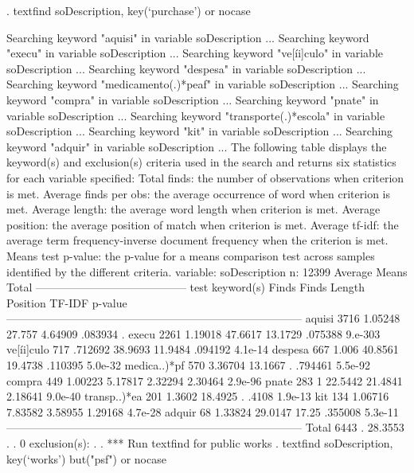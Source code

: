 {\smallskip}
. textfind soDescription, key(`purchase') or nocase
 
Searching keyword "aquisi" in variable soDescription ...
Searching keyword "execu" in variable soDescription ...
Searching keyword "ve[íi]culo" in variable soDescription ...
Searching keyword "despesa" in variable soDescription ...
Searching keyword "medicamento(.)*peaf" in variable soDescription ...
Searching keyword "compra" in variable soDescription ...
Searching keyword "pnate" in variable soDescription ...
Searching keyword "transporte(.)*escola" in variable soDescription ...
Searching keyword "kit" in variable soDescription ...
Searching keyword "adquir" in variable soDescription ...
{\smallskip}
{\smallskip}
The following table displays the keyword(s) and exclusion(s) criteria used in
the search and returns six statistics for each variable specified:
{\smallskip}
Total finds:           the number of observations when criterion is met.
Average finds per obs: the average occurrence of word when criterion is met.
Average length:        the average word length when criterion is met.
Average position:      the average position of match when criterion is met.
Average tf-idf:        the average term frequency-inverse document frequency
                       when the criterion is met.
Means test p-value:    the p-value for a means comparison test across samples
                       identified by the different criteria.
{\smallskip}
                               {}                               
variable:   soDescription
n: 12399                                     Average                       Means
                    Total   -----------------------------------------       test
keyword(s)          Finds      Finds     Length   Position     TF-IDF    p-value
--------------------------------------------------------------------------------
aquisi               3716    1.05248     27.757    4.64909    .083934          .
execu                2261    1.19018    47.6617    13.1729    .075388    9.e-303
ve[íi]culo            717    .712692    38.9693    11.9484    .094192    4.1e-14
despesa               667      1.006    40.8561    19.4738    .110395    5.0e-32
medica..)*p{\tytilde}f         570    3.36704    13.1667          .    .794461    5.5e-92
compra                449    1.00223    5.17817    2.32294    2.30464    2.9e-96
pnate                 283          1    22.5442    21.4841    2.18641    9.0e-40
transp..)*e{\tytilde}a         201     1.3602    18.4925          .      .4108    1.9e-13
kit                   134    1.06716    7.83582    3.58955    1.29168    4.7e-28
adquir                 68    1.33824    29.0147      17.25    .355008    5.3e-11
--------------------------------------------------------------------------------
Total                6443          .    28.3553          .          .          0
exclusion(s):
{\smallskip}
{\smallskip}
. 
. *** Run textfind for public works
{\smallskip}
. textfind soDescription, key(`works') but("psf") or nocase
 
